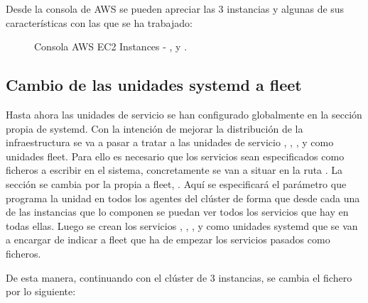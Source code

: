 Desde la consola de AWS se pueden apreciar las 3 instancias y algunas de sus características con las que se ha trabajado:

\begin{figure}[H]
\caption{Consola AWS EC2 Instances - ,  y .}
\end{figure}

\subsection{Cambio de las unidades systemd a fleet}

Hasta ahora las unidades de servicio se han configurado globalmente en la sección propia de systemd. Con la intención de mejorar la distribución de la infraestructura se va a pasar a tratar a las unidades de servicio , , ,  y  como unidades fleet. Para ello es necesario que los servicios sean especificados como ficheros a escribir en el sistema, concretamente se van a situar en la ruta . La sección \kode{[Install]} se cambia por la propia a fleet, . Aquí se especificará el parámetro  que programa la unidad en todos los agentes del clúster de forma que desde cada una de las instancias que lo componen se puedan ver todos los servicios que hay en todas ellas. Luego se crean los servicios , , ,  y  como unidades systemd que se van a encargar de indicar a fleet que ha de empezar los servicios pasados como ficheros. 

De esta manera, continuando con el clúster de 3 instancias, se cambia el fichero  por lo siguiente:

